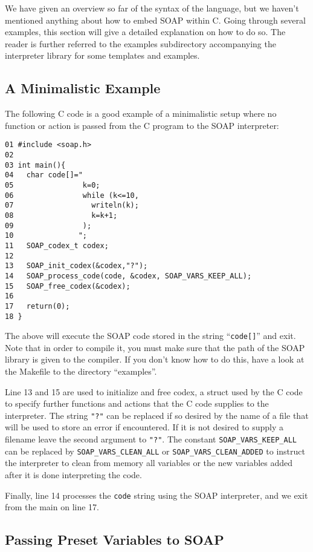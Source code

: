 \documentclass{warpdoc}
\begin{document}
We have given an overview so far of the syntax of the language,
but we haven't mentioned anything about how to embed SOAP within C.
Going through several examples,
this section will give a detailed explanation on how to do so.
The reader is further referred to the examples subdirectory accompanying
the interpreter library for some templates and examples.


\subsection{A Minimalistic Example}

The following C code is a good example of a minimalistic setup
where no function or action is passed from the C program to
the SOAP interpreter:
%
\begin{verbatim}
01 #include <soap.h>
02
03 int main(){
04   char code[]="
05                k=0;
06                while (k<=10,
07                  writeln(k);
08                  k=k+1;
09                );
10               ";
11   SOAP_codex_t codex;
12
13   SOAP_init_codex(&codex,"?");
14   SOAP_process_code(code, &codex, SOAP_VARS_KEEP_ALL);
15   SOAP_free_codex(&codex);
16
17   return(0);
18 }
\end{verbatim}
%
The above will execute the SOAP code stored in the string ``\verb|code[]|''
and exit. Note that in order to compile it, you must make sure that
the path of the SOAP library is given to the compiler. If you
don't know how to do this, have a look at the Makefile to the directory ``examples''.

Line 13 and 15 are used to initialize and free codex, a struct used by
the C code to specify further functions and actions
that the C code  supplies to the interpreter. The string \verb|"?"| can be replaced if so desired by 
the name of a file that will be used to store an error if encountered. If it is
not desired to supply a filename leave the second argument to \verb|"?"|. The constant \verb|SOAP_VARS_KEEP_ALL|
can be replaced by \verb|SOAP_VARS_CLEAN_ALL| or \verb|SOAP_VARS_CLEAN_ADDED| to instruct the interpreter to
clean from memory all variables or the new variables added after it is done interpreting the
code.

Finally, line 14 processes the \verb|code| string using the SOAP interpreter,
and we exit from the main on line 17.




\subsection{Passing Preset Variables to SOAP}
\end{document}
